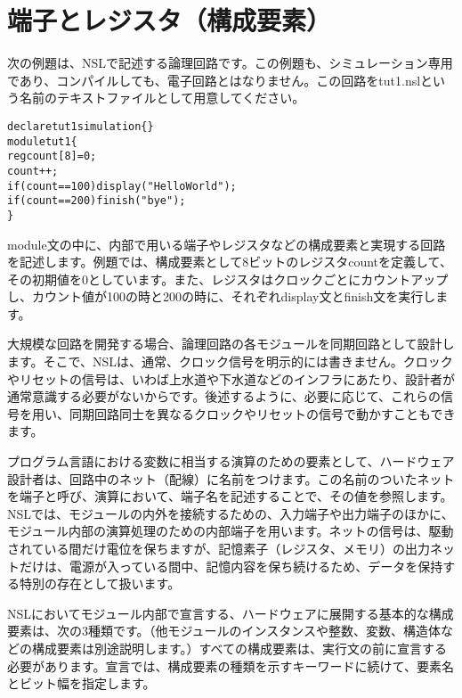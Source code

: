 \chapter{端子とレジスタ（構成要素）}
\label{chap:term}

次の例題は、NSLで記述する論理回路です。この例題も、シミュレーション専用であり、コンパイルしても、電子回路とはなりません。この回路をtut1.nslという名前のテキストファイルとして用意してください。

\begin{reviewlist}
\begin{alltt}
declare tut1 simulation \{ \}
module tut1 \{
   reg count[8] = 0;
   count++;
   if(count==100) \textunderscore{}display("Hello World");
   if(count==200) \textunderscore{}finish("bye");
\}
\end{alltt}
\end{reviewlist}


module文の中に、内部で用いる端子やレジスタなどの構成要素と実現する回路を記述します。例題では、構成要素として8ビットのレジスタcountを定義して、その初期値を0としています。また、レジスタはクロックごとにカウントアップし、カウント値が100の時と200の時に、それぞれ\textunderscore{}display文と\textunderscore{}finish文を実行します。

大規模な回路を開発する場合、論理回路の各モジュールを同期回路として設計します。そこで、NSLは、通常、クロック信号を明示的には書きません。クロックやリセットの信号は、いわば上水道や下水道などのインフラにあたり、設計者が通常意識する必要がないからです。後述するように、必要に応じて、これらの信号を用い、同期回路同士を異なるクロックやリセットの信号で動かすこともできます。

プログラム言語における変数に相当する演算のための要素として、ハードウェア設計者は、回路中のネット（配線）に名前をつけます。この名前のついたネットを端子と呼び、演算において、端子名を記述することで、その値を参照します。NSLでは、モジュールの内外を接続するための、入力端子や出力端子のほかに、モジュール内部の演算処理のための内部端子を用います。ネットの信号は、駆動されている間だけ電位を保ちますが、記憶素子（レジスタ、メモリ）の出力ネットだけは、電源が入っている間中、記憶内容を保ち続けるため、データを保持する特別の存在として扱います。

NSLにおいてモジュール内部で宣言する、ハードウェアに展開する基本的な構成要素は、次の3種類です。（他モジュールのインスタンスや整数、変数、構造体などの構成要素は別途説明します。）すべての構成要素は、実行文の前に宣言する必要があります。宣言では、構成要素の種類を示すキーワードに続けて、要素名とビット幅を指定します。


